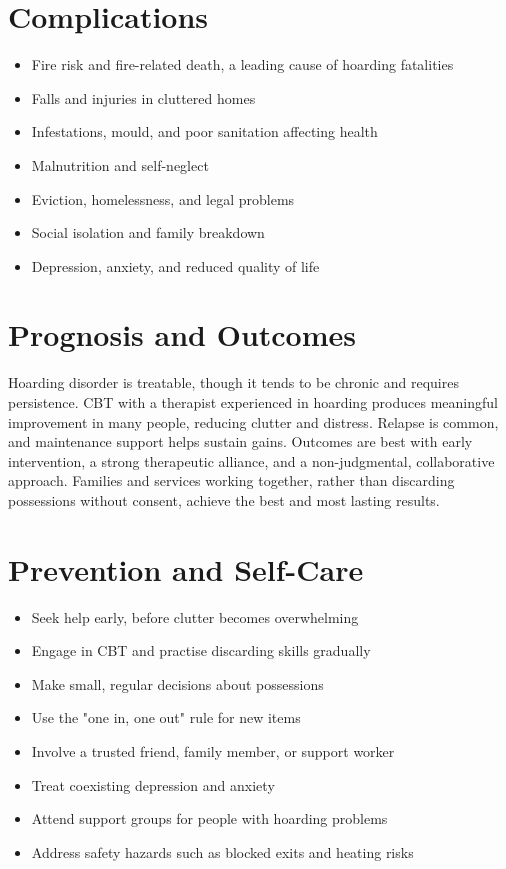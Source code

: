 \section*{Complications}
\begin{itemize}
    \item Fire risk and fire-related death, a leading cause of hoarding fatalities
    \item Falls and injuries in cluttered homes
    \item Infestations, mould, and poor sanitation affecting health
    \item Malnutrition and self-neglect
    \item Eviction, homelessness, and legal problems
    \item Social isolation and family breakdown
    \item Depression, anxiety, and reduced quality of life
\end{itemize}

\section*{Prognosis and Outcomes}
Hoarding disorder is treatable, though it tends to be chronic and requires persistence. CBT with a therapist experienced in hoarding produces meaningful improvement in many people, reducing clutter and distress. Relapse is common, and maintenance support helps sustain gains. Outcomes are best with early intervention, a strong therapeutic alliance, and a non-judgmental, collaborative approach. Families and services working together, rather than discarding possessions without consent, achieve the best and most lasting results.

\section*{Prevention and Self-Care}
\begin{itemize}
    \item Seek help early, before clutter becomes overwhelming
    \item Engage in CBT and practise discarding skills gradually
    \item Make small, regular decisions about possessions
    \item Use the "one in, one out" rule for new items
    \item Involve a trusted friend, family member, or support worker
    \item Treat coexisting depression and anxiety
    \item Attend support groups for people with hoarding problems
    \item Address safety hazards such as blocked exits and heating risks
\end{itemize}

